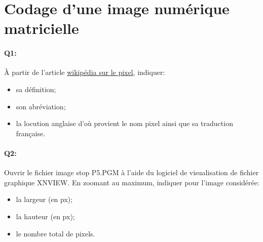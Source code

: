 \documentclass{article}
\begin{document}
\section{Codage d'une image numérique matricielle}
\paragraph{Q1:}
À partir de l'article \href{https://fr.wikipedia.org/wiki/Pixel}{wikipédia sur le pixel}, indiquer:
\begin{itemize}
	\item sa définition;
	\item son abréviation;
	\item la locution anglaise d’où provient le nom \og{}pixel\fg{} ainsi que sa traduction française.
\end{itemize}

\vspace{1em}
\begin{Form}
	\TextField[name=r1,width=\linewidth,height=5em,multiline=true]{}
\end{Form}

\paragraph{Q2:}
Ouvrir le fichier image \og{}stop P5.PGM\fg{} à l'aide du logiciel de visualisation de fichier graphique XNVIEW. 
En zoomant au maximum, indiquer pour l'image considérée:
\begin{itemize}
	\item la largeur (en px);
	\item la hauteur (en px);
	\item le nombre total de pixels.
\end{itemize}

\vspace{1em}
\begin{Form}
	\TextField[name=r1,width=\linewidth,height=5em,multiline=true]{}
\end{Form}
\end{document}
